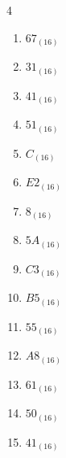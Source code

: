 \begin{multicols}{4}
\begin{enumerate}
  \item $67_{(16)}$

        \phantom{$=103$}

  \item $31_{(16)}$

        \phantom{$=49$}

  \item $41_{(16)}$

        \phantom{$=65$}

  \item $51_{(16)}$

        \phantom{$=81$}

  \item $C_{(16)}$

        \phantom{$=12$}

  \item $E2_{(16)}$

        \phantom{$=226$}

  \item $8_{(16)}$

        \phantom{$=8$}

  \item $5A_{(16)}$

        \phantom{$=90$}

  \item $C3_{(16)}$

        \phantom{$=195$}

  \item $B5_{(16)}$

        \phantom{$=181$}

  \item $55_{(16)}$

        \phantom{$=85$}

  \item $A8_{(16)}$

        \phantom{$=168$}

  \item $61_{(16)}$

        \phantom{$=97$}

  \item $50_{(16)}$

        \phantom{$=80$}

\columnbreak %

\resetques

  \item $41_{(16)}$

        \phantom{$=65$}


\end{enumerate}
\end{multicols}
